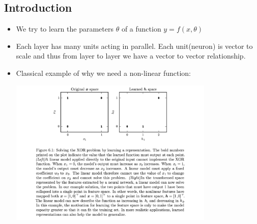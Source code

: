 \documentclass[a4paper]{article}
\begin{document}
\subsection{Introduction}
\begin{itemize}
\item We try to learn the parameters $\theta$ of a function $y=f(x,\theta)$
\item Each layer has many units acting in parallel. Each unit(neuron) is vector to scale and thus from layer to layer we have a vector to vector relationship.
\item Classical example of why we need a non-linear function: 
\begin{center}
\includegraphics[width = \textwidth, height=7cm]{image/xor.png}
\end{center}



\end{itemize}
\end{document}
